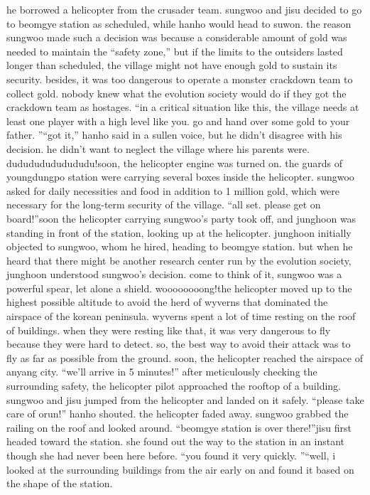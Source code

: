 he borrowed a helicopter from the crusader team.
 sungwoo and jisu decided to go to beomgye station as scheduled, while hanho would head to suwon.
the reason sungwoo made such a decision was because a considerable amount of gold was needed to maintain the “safety zone,” but if the limits to the outsiders lasted longer than scheduled, the village might not have enough gold to sustain its security.
besides, it was too dangerous to operate a monster crackdown team to collect gold.
 nobody knew what the evolution society would do if they got the crackdown team as hostages.
“in a critical situation like this, the village needs at least one player with a high level like you.
 go and hand over some gold to your father.
”“got it,” hanho said in a sullen voice, but he didn’t disagree with his decision.
 he didn’t want to neglect the village where his parents were.
dudududududududu!soon, the helicopter engine was turned on.
 the guards of youngdungpo station were carrying several boxes inside the helicopter.
sungwoo asked for daily necessities and food in addition to 1 million gold, which were necessary for the long-term security of the village.
“all set.
 please get on board!”soon the helicopter carrying sungwoo’s party took off, and junghoon was standing in front of the station, looking up at the helicopter.
junghoon initially objected to sungwoo, whom he hired, heading to beomgye station.
 but when he heard that there might be another research center run by the evolution society, junghoon understood sungwoo’s decision.
come to think of it, sungwoo was a powerful spear, let alone a shield.
woooooooong!the helicopter moved up to the highest possible altitude to avoid the herd of wyverns that dominated the airspace of the korean peninsula.
wyverns spent a lot of time resting on the roof of buildings.
 when they were resting like that, it was very dangerous to fly because they were hard to detect.
 so, the best way to avoid their attack was to fly as far as possible from the ground.
soon, the helicopter reached the airspace of anyang city.
“we’ll arrive in 5 minutes!”
after meticulously checking the surrounding safety, the helicopter pilot approached the rooftop of a building.
 sungwoo and jisu jumped from the helicopter and landed on it safely.
“please take care of orun!” hanho shouted.
the helicopter faded away.
sungwoo grabbed the railing on the roof and looked around.
“beomgye station is over there!”jisu first headed toward the station.
 she found out the way to the station in an instant though she had never been here before.
“you found it very quickly.
”“well, i looked at the surrounding buildings from the air early on and found it based on the shape of the station.
